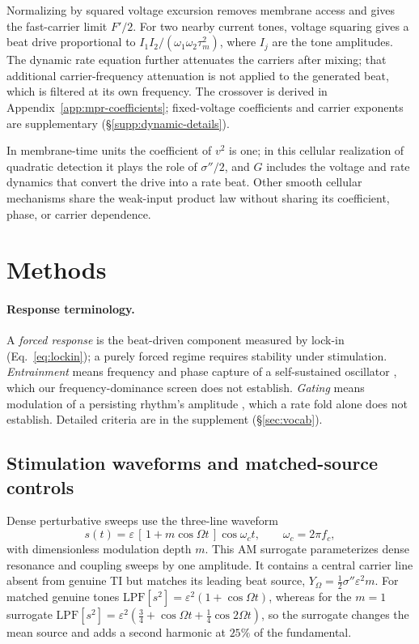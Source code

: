 \documentclass[a4paper]{article}
\newcommand{\Sig}{\sigma}
\newcommand{\half}{\tfrac{1}{2}}
\begin{document}
Normalizing by squared voltage excursion removes membrane access and gives
the fast-carrier limit $F'/2$. For two nearby current tones, voltage squaring
gives a beat drive proportional to $I_1I_2/(\omega_1\omega_2\tau_m^2)$,
where $I_j$ are the tone amplitudes.
The dynamic rate equation further attenuates the carriers after mixing;
that additional carrier-frequency attenuation is not applied to the generated
beat, which is filtered at its own frequency.
The crossover is derived in
Appendix~\ref{app:mpr-coefficients}; fixed-voltage coefficients and carrier
exponents are supplementary (\S\ref{supp:dynamic-details}).

In membrane-time units the coefficient of $v^2$ is one; in this cellular realization
of quadratic detection it plays the role of $\Sig''/2$, and $G$ includes the voltage
and rate dynamics that convert the drive into a rate beat. Other smooth cellular
mechanisms share the weak-input product law without sharing its coefficient, phase,
or carrier dependence.

\section{Methods}

\paragraph{Response terminology.}\label{sec:vocab-methods}
A \emph{forced response} is the beat-driven component measured by lock-in
(Eq.~\eqref{eq:lockin}); a purely forced regime requires stability under
stimulation. \emph{Entrainment} means frequency and phase capture of a self-sustained
oscillator \cite{pikovsky2001}, which our frequency-dominance screen does not
establish. \emph{Gating} means modulation of a persisting rhythm's amplitude
\cite{canolty2010,tort2010}, which a rate fold alone does not establish. Detailed criteria
are in the supplement (\S\ref{sec:vocab}).

\subsection{Stimulation waveforms and matched-source controls}\label{sec:waveforms}
Dense perturbative sweeps use the three-line waveform
\begin{equation}
s(t)=\varepsilon\,[\,1+m\cos\Omega t\,]\cos\omega_c t,\qquad \omega_c=2\pi f_c ,
\label{eq:amsur}
\end{equation}
with dimensionless modulation depth $m$. This AM surrogate parameterizes dense resonance
and coupling sweeps by one amplitude. It contains a central carrier line absent from
genuine TI but matches its leading beat source, $Y_\Omega=\half\Sig''\varepsilon^2m$.
For matched genuine tones $\mathrm{LPF}[s^2]=\varepsilon^2(1+\cos\Omega t)$, whereas for
the $m=1$ surrogate
$\mathrm{LPF}[s^2]=\varepsilon^2(\tfrac34+\cos\Omega t+\tfrac14\cos2\Omega t)$, so the
surrogate changes the mean source and adds a second harmonic at $25\%$ of the
fundamental.
\end{document}

